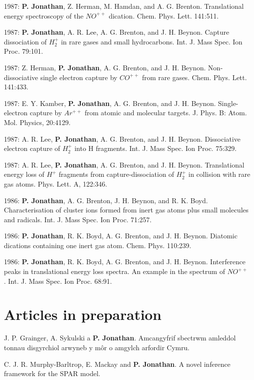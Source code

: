 \documentclass[11pt,a4paper]{moderncv}
\begin{document}
1987: \textbf{P. Jonathan}, Z. Herman, M. Hamdan, and A. G. Brenton. Translational energy spectroscopy of the $NO^{++}$ dication. Chem. Phys. Lett. 141:511.

1987: \textbf{P. Jonathan}, A. R. Lee, A. G. Brenton, and J. H. Beynon. Capture dissociation of $H_2^+$ in rare gases and small hydrocarbons. Int. J. Mass Spec. Ion Proc. 79:101.

1987: Z. Herman, \textbf{P. Jonathan}, A. G. Brenton, and J. H. Beynon. Non-dissociative single electron capture by $CO^{++}$ from rare gases. Chem. Phys. Lett. 141:433.

1987: E. Y. Kamber, \textbf{P. Jonathan}, A. G. Brenton, and J. H. Beynon. Single-electron capture by $Ar^{++}$ from atomic and molecular targets. J. Phys. B: Atom. Mol. Physics, 20:4129.

1987: A. R. Lee, \textbf{P. Jonathan}, A. G. Brenton, and J. H. Beynon. Dissociative electron capture of $H_2^+$ into H fragments. Int. J. Mass Spec. Ion Proc. 75:329.

1987: A. R. Lee, \textbf{P. Jonathan}, A. G. Brenton, and J. H. Beynon. Translational energy loss of $H^+$ fragments from capture-dissociation of $H_2^+$ in collision with rare gas atoms. Phys. Lett. A, 122:346.

1986: \textbf{P. Jonathan}, A. G. Brenton, J. H. Beynon, and R. K. Boyd. Characterisation of cluster ions formed from inert gas atoms plus small molecules and radicals. Int. J. Mass Spec. Ion Proc. 71:257.

1986: \textbf{P. Jonathan}, R. K. Boyd, A. G. Brenton, and J. H. Beynon. Diatomic dications containing one inert gas atom. Chem. Phys. 110:239.

1986: \textbf{P. Jonathan}, R. K. Boyd, A. G. Brenton, and J. H. Beynon. Interference peaks in translational energy loss spectra. An example in the spectrum of $NO^{++}$ . Int. J. Mass Spec. Ion Proc. 68:91.

\setlength{\parskip}{0em}

\section{Articles in preparation}

\setlength{\parskip}{0.5em}

J. P. Grainger, A. Sykulski a \textbf{P. Jonathan}. Amcangyfrif sbectrwm amleddol tonnau disgyrchiol arwyneb y m\^or o amgylch arfordir Cymru.

C. J. R. Murphy-Barltrop, E. Mackay and \textbf{P. Jonathan}. A novel inference framework for the SPAR model.
\end{document}
